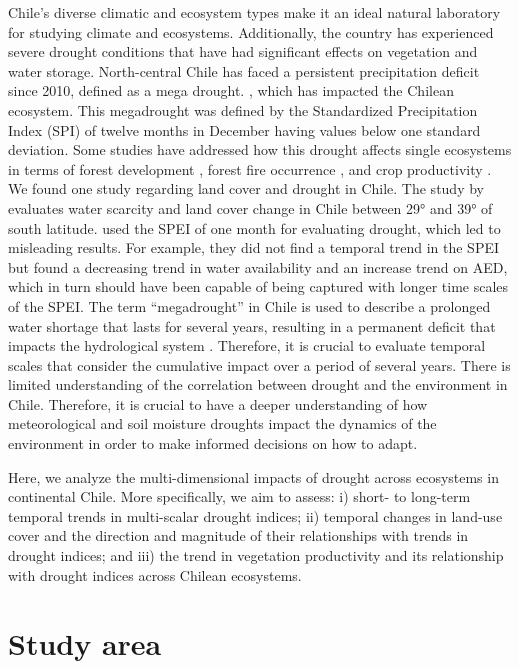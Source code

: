 \documentclass[
  authoryear,
  preprint,
  3p,
  onecolumn]{elsarticle}
\begin{document}
Chile's diverse climatic and ecosystem types
\citep{Beck2023, Luebert2022} make it an ideal natural laboratory for
studying climate and ecosystems. Additionally, the country has
experienced severe drought conditions that have had significant effects
on vegetation and water storage. North-central Chile has faced a
persistent precipitation deficit since 2010, defined as a mega drought.
\citep{Garreaud2017}, which has impacted the Chilean ecosystem. This
megadrought was defined by the Standardized Precipitation Index (SPI) of
twelve months in December having values below one standard deviation.
Some studies have addressed how this drought affects single ecosystems
in terms of forest development \citep{Miranda2020, Venegas2018}, forest
fire occurrence \citep{UrrutiaJalabert2018}, and crop productivity
\citep{Zambrano2023, Zambrano2018, Zambrano2016}. We found one study
regarding land cover and drought in Chile. The study by
\citet{Fuentes2021} evaluates water scarcity and land cover change in
Chile between 29° and 39° of south latitude. \citet{Fuentes2021} used
the SPEI of one month for evaluating drought, which led to misleading
results. For example, they did not find a temporal trend in the SPEI but
found a decreasing trend in water availability and an increase trend on
AED, which in turn should have been capable of being captured with
longer time scales of the SPEI. The term ``megadrought'' in Chile is
used to describe a prolonged water shortage that lasts for several
years, resulting in a permanent deficit that impacts the hydrological
system \citep{Boisier2018}. Therefore, it is crucial to evaluate
temporal scales that consider the cumulative impact over a period of
several years. There is limited understanding of the correlation between
drought and the environment in Chile. Therefore, it is crucial to have a
deeper understanding of how meteorological and soil moisture droughts
impact the dynamics of the environment in order to make informed
decisions on how to adapt.

Here, we analyze the multi-dimensional impacts of drought across
ecosystems in continental Chile. More specifically, we aim to assess: i)
short- to long-term temporal trends in multi-scalar drought indices; ii)
temporal changes in land-use cover and the direction and magnitude of
their relationships with trends in drought indices; and iii) the trend
in vegetation productivity and its relationship with drought indices
across Chilean ecosystems.

\hypertarget{study-area}{%
\section{Study area}\label{study-area}}
\end{document}
